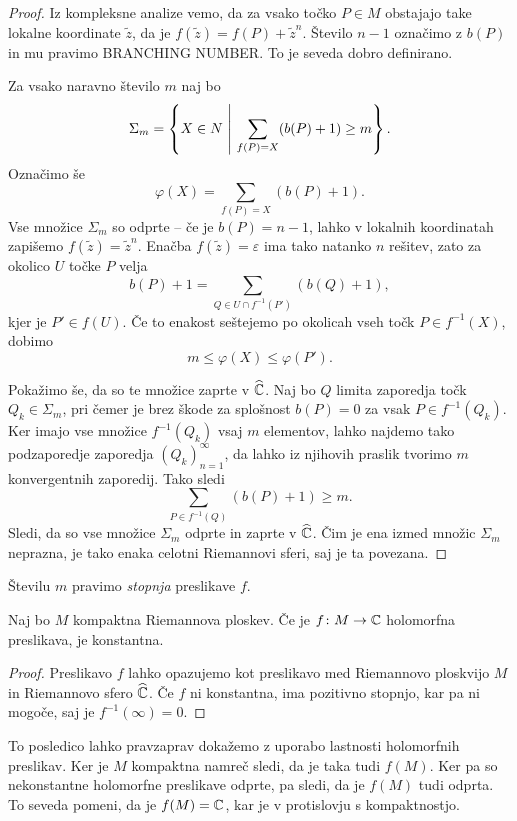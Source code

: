 \begin{proof}
Iz kompleksne analize vemo, da za vsako točko $P \in M$ obstajajo
take lokalne koordinate $\tilde{z}$, da je
$f(\tilde{z}) = f(P) + \tilde{z}^n$. Število $n-1$ označimo z
$b(P)$ in mu pravimo BRANCHING NUMBER. To je seveda dobro
definirano.

Za vsako naravno število $m$ naj bo
\[
\Sigma_m =
\left\{X \in N~\middle\vert~\sum_{f(P)=X} (b(P)+1) \geq m\right\}.
\]
Označimo še
\[
\varphi(X) = \sum_{f(P) = X} (b(P)+1).
\]
Vse množice $\Sigma_m$ so odprte -- če je $b(P) = n-1$, lahko v
lokalnih koordinatah zapišemo $f(\tilde{z}) = \tilde{z}^n$. Enačba
$f(\tilde{z}) = \varepsilon$ ima tako natanko $n$ rešitev, zato za
okolico $U$ točke $P$ velja
\[
b(P) + 1 = \sum_{Q \in U \cap f^{-1}(P')} (b(Q) + 1),
\]
kjer je $P' \in f(U)$. Če to enakost seštejemo po okolicah vseh točk $P \in f^{-1}(X)$, dobimo
\[
m \leq \varphi(X) \leq \varphi(P').
\]

Pokažimo še, da so te množice zaprte v $\widehat{\mathbb{C}}$. Naj bo $Q$ limita
zaporedja točk $Q_k \in \Sigma_m$, pri čemer je brez škode za
splošnost $b(P) = 0$ za vsak $P \in f^{-1}(Q_k)$. Ker imajo vse
množice $f^{-1}(Q_k)$ vsaj $m$ elementov, lahko najdemo tako
podzaporedje zaporedja $(Q_k)_{n=1}^\infty$, da lahko iz njihovih
praslik tvorimo $m$ konvergentnih zaporedij. Tako sledi
\[
\sum_{P \in f^{-1}(Q)} (b(P)+1) \geq m.
\]
Sledi, da so vse množice $\Sigma_m$ odprte in zaprte v $\widehat{\mathbb{C}}$. Čim
je ena izmed množic $\Sigma_m$ neprazna, je tako enaka celotni
Riemannovi sferi, saj je ta povezana.
\end{proof}

Številu $m$ pravimo \emph{stopnja} preslikave $f$.

\begin{posledica}
Naj bo $M$ kompaktna Riemannova ploskev. Če je $f \colon M \to \mathbb{C}$
holomorfna preslikava, je konstantna.
\end{posledica}

\begin{proof}
Preslikavo $f$ lahko opazujemo kot preslikavo med Riemannovo
ploskvijo $M$ in Riemannovo sfero $\widehat{\mathbb{C}}$. Če $f$ ni konstantna, ima
pozitivno stopnjo, kar pa ni mogoče, saj je $f^{-1}(\infty) = 0$.
\end{proof}

To posledico lahko pravzaprav dokažemo z uporabo lastnosti
holomorfnih preslikav. Ker je $M$ kompaktna namreč sledi, da je
taka tudi $f(M)$. Ker pa so nekonstantne holomorfne preslikave
odprte, pa sledi, da je $f(M)$ tudi odprta. To seveda pomeni, da je
$f(M) = \mathbb{C}$, kar je v protislovju s kompaktnostjo.

